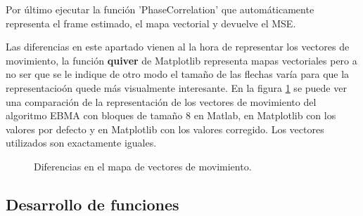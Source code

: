 \documentclass[a4paper,12pt]{report}
\begin{document}
Por último ejecutar la función 'PhaseCorrelation' que automáticamente representa el frame estimado, el mapa vectorial y devuelve el MSE.

Las diferencias en este apartado vienen al la hora de representar los vectores de movimiento, la función \textbf{quiver} de Matplotlib representa mapas vectoriales pero a no ser que se le indique de otro modo el tamaño de las flechas varía para que la representacioón quede más visualmente interesante. En la figura \ref{arrow} se puede ver una comparación de la representación  de los vectores de movimiento del algoritmo EBMA con bloques de tamaño 8 en Matlab, en Matplotlib con los valores por defecto y en Matplotlib con los valores corregido. Los vectores utilizados son exactamente iguales.\\

\begin{figure}[!tbp]
  \centering
  \hfill
  \hfill
  \caption{Diferencias en el mapa de vectores de movimiento.}
  \label{arrow}
\end{figure}
\subsection{Desarrollo de funciones}
\end{document}

